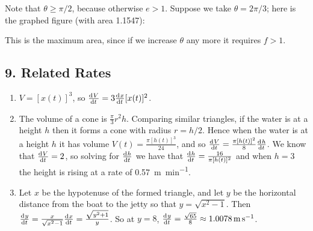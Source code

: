 \begin{enumerate}
        Note that $ \theta \geq \pi/2 $, because otherwise $ e > 1 $. Suppose we take $ \theta = 2\pi/3 $; here is the graphed figure (with area 1.1547):
        \begin{center}
        \end{center}
        This is the maximum area, since if we increase $ \theta $ any more it requires $ f > 1 $.
\end{enumerate}

\subsection*{9. Related Rates}
\begin{enumerate}
  \item $ V = [x(t)]^3 $, so $ \od{V}{t} = 3\od{x}{t} [x(t)]^2 $.
  \item The volume of a cone is $ \frac{\pi}{3}r^2 h $. Comparing similar triangles, if the water is at a height $ h $ then it forms a cone
        with radius $ r = h/2 $. Hence when the water is at a height $ h $ it has volume $ V(t) = \frac{\pi [h(t)]^3}{24} $, and
        so $ \od{V}{t} = \frac{\pi [h(t)]^2}{8} \od{h}{t} $. We know that $ \od{V}{t} = 2 $, so solving for $ \od{h}{t} $ we have
        that $ \od{h}{t} = \frac{16}{\pi [h(t)]^2} $ and when $ h = 3 $ the height is rising at a rate of \SI{0.57}{\metre\per\minute}.
  \item Let $ x $ be the hypotenuse of the formed triangle, and let $ y $ be the horizontal distance from the boat to the jetty
        so that $ y = \sqrt{x^2 - 1} $. Then $ \od{y}{t} = \frac{x}{\sqrt{x^2 - 1}} \od{x}{t} = \frac{\sqrt{y^2 + 1}}{y} $. So
        at $ y = 8 $, $ \od{y}{t} = \frac{\sqrt{65}}{8} \approx \SI{1.0078}{\metre\per\second} $.
\end{enumerate}

